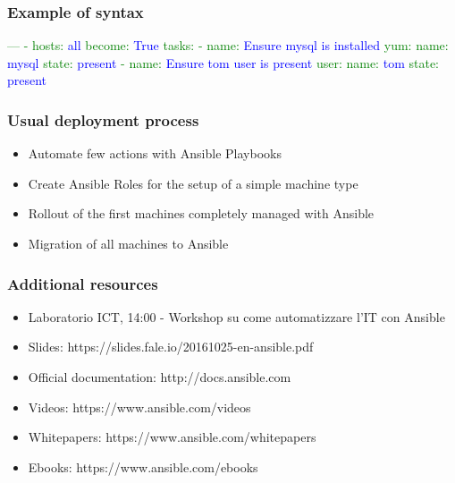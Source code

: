 \documentclass[t,aspectratio=169]{beamer}
\begin{document}
\begin{frame}[fragile]
    \frametitle{Example of syntax}
    \begin{semiverbatim}
\textcolor{green}{---}
\textcolor{green}{- hosts:} \textcolor{blue}{all}
\textcolor{green}{  become:} \textcolor{blue}{True}
\textcolor{green}{  tasks:}
\textcolor{green}{  - name:} \textcolor{blue}{Ensure mysql is installed}
\textcolor{green}{    yum:}
\textcolor{green}{      name:} \textcolor{blue}{mysql}
\textcolor{green}{      state:} \textcolor{blue}{present}
\textcolor{green}{  - name:} \textcolor{blue}{Ensure tom user is present}
\textcolor{green}{    user:}
\textcolor{green}{      name:} \textcolor{blue}{tom}
\textcolor{green}{      state:} \textcolor{blue}{present}
    \end{semiverbatim}
\end{frame}

\begin{frame}
    \frametitle{Usual deployment process}
    \begin{itemize}
        \item<2-> Automate few actions with Ansible Playbooks
        \item<3-> Create Ansible Roles for the setup of a simple machine type
        \item<4-> Rollout of the first machines completely managed with Ansible
        \item<5-> Migration of all machines to Ansible
    \end{itemize}
\end{frame}

\begin{frame}
    \frametitle{Additional resources}
    \begin{itemize}
        \item Laboratorio ICT, 14:00 - Workshop su come automatizzare l'IT con Ansible
        \item Slides: https://slides.fale.io/20161025-en-ansible.pdf
        \item Official documentation: http://docs.ansible.com
        \item Videos: https://www.ansible.com/videos
        \item Whitepapers: https://www.ansible.com/whitepapers
        \item Ebooks: https://www.ansible.com/ebooks
    \end{itemize}
\end{frame}

\end{document}
